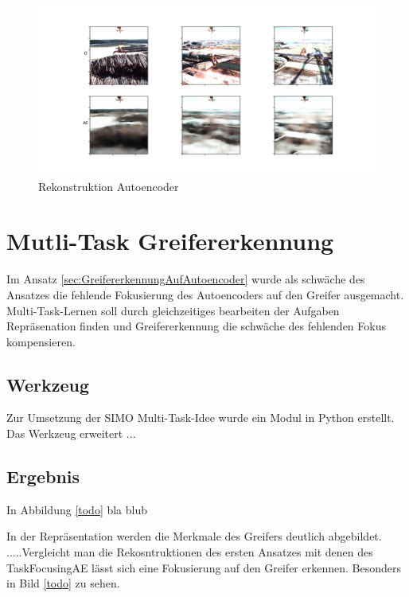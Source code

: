 	\begin{figure}[h]
		\centering
		\includegraphics[width=1\textwidth, center]{bilder/Hauptteil/Autoencoder_Grappel_Detection/OriginalPicturesAndReconstruction.png}
		\caption{Rekonstruktion Autoencoder}
		\label{img:Rekonstruktion AE}
	\end{figure}  
	
	
	
	\section{Mutli-Task Greifererkennung}
	\label{sec:MultiTaskGreifererkennung}
	Im Ansatz \ref{sec:GreifererkennungAufAutoencoder} wurde als schwäche des Ansatzes die fehlende Fokusierung des Autoencoders auf den Greifer ausgemacht. Multi-Task-Lernen soll durch gleichzeitiges bearbeiten der Aufgaben Repräsenation finden und Greifererkennung die schwäche des fehlenden Fokus kompensieren.   
	\subsection{Werkzeug}
	Zur Umsetzung der SIMO Multi-Task-Idee wurde ein Modul in Python erstellt. Das Werkzeug erweitert ...  
	\subsection{Ergebnis}
	In Abbildung \ref{todo} bla blub
	
	In der Repräsentation werden die Merkmale des Greifers deutlich abgebildet. .....Vergleicht man die Rekosntruktionen des ersten Ansatzes mit denen des TaskFocusingAE lässt sich eine Fokusierung auf den Greifer erkennen. Besonders in Bild \ref{todo} zu sehen.
	
